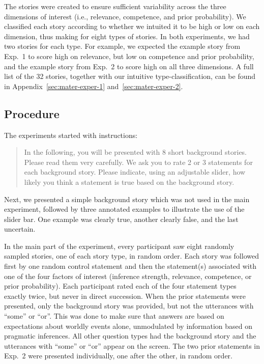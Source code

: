 \documentclass[12pt]{article}
\begin{document}
The stories were created to ensure sufficient variability across the three dimensions of
interest (i.e., relevance, competence, and prior probability). We classified each story
according to whether we intuited it to be high or low on each dimension, thus making for eight
types of stories. In both experiments, we had two stories for each type. For example, we
expected the example story from Exp.\ 1 to score high on relevance, but low on competence and
prior probability, and the example story from Exp.\ 2 to score high on all three dimensions. A
full list of the 32 stories, together with our intuitive type-classification, can be found in
Appendix~\ref{sec:mater-exper-1} and~\ref{sec:mater-exper-2}.

\subsection*{Procedure}

The experiments started with instructions:

\begin{quote}
  In the following, you will be presented with 8 short background stories. Please read them
  very carefully. We ask you to rate 2 or 3 statements for each background story. Please
  indicate, using an adjustable slider, how likely you think a statement is true based on the
  background story.
\end{quote}

\noindent Next, we presented a simple background story which was not used in the main
experiment, followed by three annotated examples to illustrate the use of the slider bar. One example was clearly true, another clearly false, and the last uncertain.

In the main part of the experiment, every participant saw eight randomly sampled stories, one
of each story type, in random order. Each story was followed first by one random control
statement and then the statement(s) associated with one of the four factors of interest
(inference strength, relevance, competence, or prior probability). Each participant rated each
of the four statement types exactly twice, but never in direct succession. When the prior
statements were presented, only the background story was provided, but not the utterances with
``some'' or ``or''. This was done to make sure that answers are based on expectations about
worldly events alone, unmodulated by information based on pragmatic inferences. All other
question types had the background story and the utterances with ``some'' or ``or'' appear on the
screen. The two prior statements in Exp.\ 2 were presented individually, one after the other,
in random order.
\end{document}
